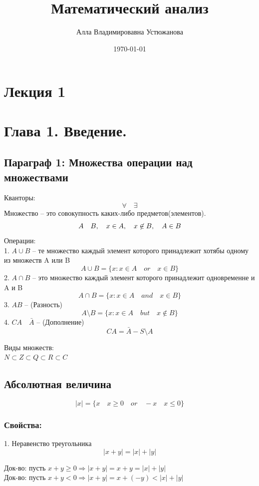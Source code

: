 \documentclass[a4paper, 12pt]{article}
\title{Математический анализ}
\author{Алла Владимировавна Устюжанова}
\date{\today}
\begin{document}
\maketitle
\section*{Лекция 1}

\section{Глава 1. Введение. }
\subsection{Параграф 1: Множества операции над множествами}
Кванторы:
\[
	\forall \quad \exists
\]
Множество -- это совокупность каких-либо предметов(элементов).
\[
	A \quad B , \\\quad
	x \in A,\\ \quad
	x \not\in B,	\\\quad
	A \in B\\
\]
Операции: \\
1. $ A \cup B $ -- те множество каждый элемент которого принадлежит хотябы одному из множеств A или B \[
	A \cup B = \{x:x \in A \quad or \quad x \in B\}	
\]
2. $ A \cap B $ -- это множество каждый элемент которого принадлежит одновременне и A и B \[
	 A \cap B = \{x: x\in A \quad and \quad x \in B\}	
\]
3. $ A B $ -- (Разность)\[
	A \setminus B = \{x: x\in A \quad but \quad x\not\in B\}	
\]
4. $ CA \quad\bar{A} $ -- (Дополнение) \[
	CA = \bar{A} - S\setminus A	
\]


Виды множеств:\\
$ N \subset Z \subset Q \subset R \subset C $\\

\subsection{Абсолютная величина}
\[
	|x| = \{x \quad x \geq 0 \quad or \quad -x \quad x\leq 0\}	
\]
\subsubsection*{Свойства:}
1. Неравенство треугольника \[
 |x+y| = |x| + |y|	
\]
\begin{mdframed}[backgroundcolor=blue!20] 
       Док-во: пусть $  x+y \geq 0\Rightarrow |x+y| = x+y=|x|+|y|$\\
       Док-во: пусть $  x+y < 0\Rightarrow |x+y| = x+(-y)<|x|+|y|$
    \end{mdframed}
\end{document}
